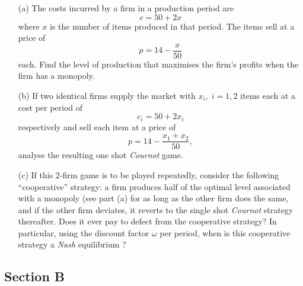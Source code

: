 \documentclass[12pt]{article}
\begin{document}
       \item
    \begin{enumerate}
    \item[(a)] The costs incurred by a firm in a production period are $$ c = 50 + 2x$$ where $x$ is the number of items produced in that period. The items sell at a price of $$ p = 14- \frac{x}{50}$$ each. Find the level of production that maximises the firm's profits when the firm has a monopoly. 
    \item[(b)]   If two identical firms supply the market with $x_i, \; i = 1,2$ items each at a cost per period of $$c_i = 50 + 2x_i$$ respectively and sell each item at a price of $$p = 14 - \frac{x_1 +x_2}{50},$$ analyse the resulting one shot \textit{Cournot} game. 
    \item[(c)]  If this 2-firm game is to be played repeatedly, consider the following ``cooperative'' strategy: a firm produces half of the optimal level associated with a monopoly (see part (a) for as long as the other firm does the same, and if the other firm deviates, it reverts to the single shot \textit{Cournot} strategy thereafter. Does it ever pay to defect from the cooperative strategy? In particular, using the discount factor $\omega$ per period, when is this cooperative strategy a \textit{Nash} equilibrium ?  
    \end{enumerate}



      \newpage

		\begin{center}  \section*{Section B} \end{center}

\end{document}

